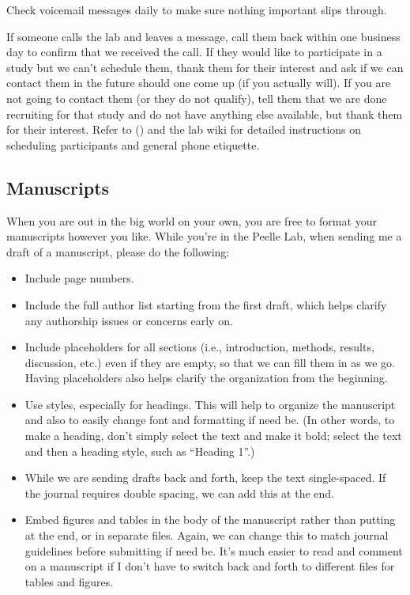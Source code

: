 \documentclass[letterpaper,12pt,oneside]{memoir}
\begin{document}
Check voicemail messages daily to make sure nothing important slips through.

If someone calls the lab and leaves a message, call them back within one business day to confirm that we received the call. If they would like to participate in a study but we can't schedule them, thank them for their interest and ask if we can contact them in the future should one come up (if you actually will). If you are not going to contact them (or they do not qualify), tell them that we are done recruiting for that study and do not have anything else available, but thank them for their interest. Refer to  () and the lab wiki for detailed instructions on scheduling participants and general phone etiquette.


\subsection{Manuscripts}

When you are out in the big world on your own, you are free to format your manuscripts however you like. While you're in the Peelle Lab, when sending me a draft of a manuscript, please do the following:

\begin{itemize}
\item Include page numbers.
\item Include the full author list starting from the first draft, which helps clarify any authorship issues or concerns early on.
\item Include placeholders for all sections (i.e., introduction, methods, results, discussion, etc.) even if they are empty, so that we can fill them in as we go. Having placeholders also helps clarify the organization from the beginning.
\item Use styles, especially for headings. This will help to organize the manuscript and also to easily change font and formatting if need be. (In other words, to make a heading, don't simply select the text and make it bold; select the text and then a heading style, such as ``Heading 1''.)
\item While we are sending drafts back and forth, keep the text single-spaced. If the journal requires double spacing, we can add this at the end.
\item Embed figures and tables in the body of the manuscript rather than putting at the end, or in separate files. Again, we can change this to match journal guidelines before submitting if need be. It's much easier to read and comment on a manuscript if I don't have to switch back and forth to different files for tables and figures.
\end{itemize}
\end{document}
